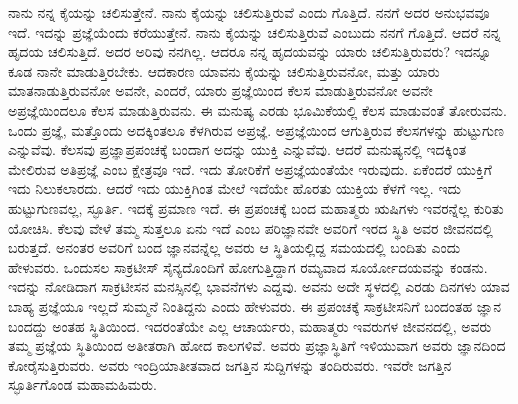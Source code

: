 ನಾನು ನನ್ನ ಕೈಯನ್ನು ಚಲಿಸುತ್ತೇನೆ. ನಾನು ಕೈಯನ್ನು ಚಲಿಸುತ್ತಿರುವೆ ಎಂದು ಗೊತ್ತಿದೆ. ನನಗೆ ಅದರ ಅನುಭವವೂ ಇದೆ. ಇದನ್ನು ಪ್ರಜ್ಞೆಯೆಂದು ಕರೆಯುತ್ತೇನೆ. ನಾನು ಕೈಯನ್ನು ಚಲಿಸುತ್ತಿರುವೆ ಎಂಬುದು ನನಗೆ ಗೊತ್ತಿದೆ. ಆದರೆ ನನ್ನ ಹೃದಯ ಚಲಿಸುತ್ತಿದೆ. ಅದರ ಅರಿವು ನನಗಿಲ್ಲ. ಆದರೂ ನನ್ನ ಹೃದಯವನ್ನು ಯಾರು ಚಲಿಸುತ್ತಿರುವರು? ಇದನ್ನೂ ಕೂಡ ನಾನೇ ಮಾಡುತ್ತಿರಬೇಕು. ಆದಕಾರಣ ಯಾವನು ಕೈಯನ್ನು ಚಲಿಸುತ್ತಿರುವನೋ, ಮತ್ತು ಯಾರು ಮಾತನಾಡುತ್ತಿರುವನೋ ಅವನೇ, ಎಂದರೆ, ಯಾರು ಪ್ರಜ್ಞೆಯಿಂದ ಕೆಲಸ ಮಾಡುತ್ತಿರುವನೋ ಅವನೇ ಅಪ್ರಜ್ಞೆಯಿಂದಲೂ ಕೆಲಸ ಮಾಡುತ್ತಿರುವನು. ಈ ಮನುಷ್ಯ ಎರಡು ಭೂಮಿಕೆಯಲ್ಲಿ ಕೆಲಸ ಮಾಡುವಂತೆ ತೋರುವನು. ಒಂದು ಪ್ರಜ್ಞೆ, ಮತ್ತೊಂದು ಅದಕ್ಕಿಂತಲೂ ಕೆಳಗಿರುವ ಅಪ್ರಜ್ಞೆ. ಅಪ್ರಜ್ಞೆಯಿಂದ ಆಗುತ್ತಿರುವ ಕೆಲಸಗಳನ್ನು ಹುಟ್ಟುಗುಣ ಎನ್ನುವೆವು. ಕೆಲಸವು ಪ್ರಜ್ಞಾಪ್ರಪಂಚಕ್ಕೆ ಬಂದಾಗ ಅದನ್ನು ಯುಕ್ತಿ ಎನ್ನುವೆವು. ಆದರೆ ಮನುಷ್ಯನಲ್ಲಿ ಇದಕ್ಕಿಂತ ಮೇಲಿರುವ ಅತಿಪ್ರಜ್ಞೆ ಎಂಬ ಕ್ಷೇತ್ರವೂ ಇದೆ. ಇದು ತೋರಿಕೆಗೆ ಅಪ್ರಜ್ಞೆಯಂತೆಯೇ ಇರುವುದು. ಏಕೆಂದರೆ ಯುಕ್ತಿಗೆ ಇದು ನಿಲುಕಲಾರದು. ಆದರೆ ಇದು ಯುಕ್ತಿಗಿಂತ ಮೇಲೆ ಇದೆಯೇ ಹೊರತು ಯುಕ್ತಿಯ ಕೆಳಗೆ ಇಲ್ಲ. ಇದು ಹುಟ್ಟುಗುಣವಲ್ಲ, ಸ್ಫೂರ್ತಿ. ಇದಕ್ಕೆ ಪ್ರಮಾಣ ಇದೆ. ಈ ಪ್ರಪಂಚಕ್ಕೆ ಬಂದ ಮಹಾತ್ಮರು ಋಷಿಗಳು ಇವರನ್ನೆಲ್ಲ ಕುರಿತು ಯೋಚಿಸಿ. ಕೆಲವು ವೇಳೆ ತಮ್ಮ ಸುತ್ತಲೂ ಏನು ಇದೆ ಎಂಬ ಪರಿಜ್ಞಾನವೇ ಅವರಿಗೆ ಇರದ ಸ್ಥಿತಿ ಅವರ ಜೀವನದಲ್ಲಿ ಬರುತ್ತದೆ. ಅನಂತರ ಅವರಿಗೆ ಬಂದ ಜ್ಞಾನವನ್ನೆಲ್ಲ ಅವರು ಆ ಸ್ಥಿತಿಯಲ್ಲಿದ್ದ ಸಮಯದಲ್ಲಿ ಬಂದಿತು ಎಂದು ಹೇಳುವರು. ಒಂದುಸಲ ಸಾಕ್ರಟೀಸ್ ಸೈನ್ಯದೊಂದಿಗೆ ಹೋಗುತ್ತಿದ್ದಾಗ ರಮ್ಯವಾದ ಸೂರ್ಯೋದಯವನ್ನು ಕಂಡನು. ಇದನ್ನು ನೋಡಿದಾಗ ಸಾಕ್ರಟೀಸನ ಮನಸ್ಸಿನಲ್ಲಿ ಭಾವನೆಗಳು ಎದ್ದವು. ಅವನು ಅದೇ ಸ್ಥಳದಲ್ಲಿ ಎರಡು ದಿನಗಳು ಯಾವ ಬಾಹ್ಯ ಪ್ರಜ್ಞೆಯೂ ಇಲ್ಲದೆ ಸುಮ್ಮನೆ ನಿಂತಿದ್ದನು ಎಂದು ಹೇಳುವರು. ಈ ಪ್ರಪಂಚಕ್ಕೆ ಸಾಕ್ರಟೀಸನಿಗೆ ಬಂದಂತಹ ಜ್ಞಾನ ಬಂದದ್ದು ಅಂತಹ ಸ್ಥಿತಿಯಿಂದ. ಇದರಂತೆಯೇ ಎಲ್ಲ ಆಚಾರ್ಯರು, ಮಹಾತ್ಮರು ಇವರುಗಳ ಜೀವನದಲ್ಲಿ, ಅವರು ತಮ್ಮ ಪ್ರಜ್ಞೆಯ ಸ್ಥಿತಿಯಿಂದ ಅತೀತರಾಗಿ ಹೋದ ಕಾಲಗಳಿವೆ. ಅವರು ಪ್ರಜ್ಞಾಸ್ಥಿತಿಗೆ ಇಳಿಯುವಾಗ ಅವರು ಜ್ಞಾನದಿಂದ ಕೋರೈಸುತ್ತಿರುವರು. ಅವರು ಇಂದ್ರಿಯಾತೀತವಾದ ಜಗತ್ತಿನ ಸುದ್ದಿಗಳನ್ನು ತಂದಿರುವರು. ಇವರೇ ಜಗತ್ತಿನ ಸ್ಫೂರ್ತಿಗೊಂಡ ಮಹಾಮಹಿಮರು.

